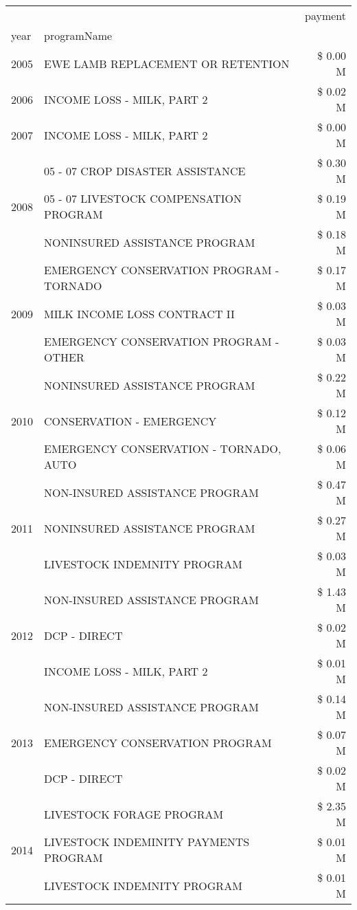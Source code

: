 \begin{tabular}{llr}
\toprule
 &  & payment \\
year & programName &  \\
\midrule
2005 & EWE LAMB REPLACEMENT OR RETENTION & \$ 0.00 M \\
\cline{1-3}
2006 & INCOME LOSS - MILK, PART 2 & \$ 0.02 M \\
\cline{1-3}
2007 & INCOME LOSS - MILK, PART 2 & \$ 0.00 M \\
\cline{1-3}
\multirow[t]{3}{*}{2008} & 05 - 07 CROP DISASTER ASSISTANCE & \$ 0.30 M \\
 & 05 - 07 LIVESTOCK COMPENSATION PROGRAM & \$ 0.19 M \\
 & NONINSURED ASSISTANCE PROGRAM & \$ 0.18 M \\
\cline{1-3}
\multirow[t]{3}{*}{2009} & EMERGENCY CONSERVATION PROGRAM - TORNADO & \$ 0.17 M \\
 & MILK INCOME LOSS CONTRACT II & \$ 0.03 M \\
 & EMERGENCY CONSERVATION PROGRAM - OTHER & \$ 0.03 M \\
\cline{1-3}
\multirow[t]{3}{*}{2010} & NONINSURED ASSISTANCE PROGRAM & \$ 0.22 M \\
 & CONSERVATION - EMERGENCY & \$ 0.12 M \\
 & EMERGENCY CONSERVATION - TORNADO, AUTO & \$ 0.06 M \\
\cline{1-3}
\multirow[t]{3}{*}{2011} & NON-INSURED ASSISTANCE PROGRAM & \$ 0.47 M \\
 & NONINSURED ASSISTANCE PROGRAM & \$ 0.27 M \\
 & LIVESTOCK INDEMNITY PROGRAM & \$ 0.03 M \\
\cline{1-3}
\multirow[t]{3}{*}{2012} & NON-INSURED ASSISTANCE PROGRAM & \$ 1.43 M \\
 & DCP - DIRECT & \$ 0.02 M \\
 & INCOME LOSS - MILK, PART 2 & \$ 0.01 M \\
\cline{1-3}
\multirow[t]{3}{*}{2013} & NON-INSURED ASSISTANCE PROGRAM & \$ 0.14 M \\
 & EMERGENCY CONSERVATION PROGRAM & \$ 0.07 M \\
 & DCP - DIRECT & \$ 0.02 M \\
\cline{1-3}
\multirow[t]{3}{*}{2014} & LIVESTOCK FORAGE PROGRAM & \$ 2.35 M \\
 & LIVESTOCK INDEMINITY PAYMENTS PROGRAM & \$ 0.01 M \\
 & LIVESTOCK INDEMNITY PROGRAM & \$ 0.01 M \\

\end{tabular}
